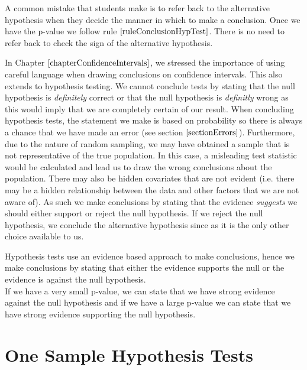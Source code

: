 \begin{nt}
A common mistake that students make is to refer back to the alternative
hypothesis when they decide the manner in which to make a conclusion.
Once we have the p-value we follow rule $\ref{ruleConclusionHypTest}$.
There is no need to refer back to check the sign of the alternative hypothesis.
\end{nt}
In Chapter $\ref{chapterConfidenceIntervals}$, we stressed the importance of using careful language when drawing conclusions on confidence intervals. This also extends to hypothesis testing. We cannot conclude tests by stating that the null hypothesis is \textit{definitely} correct or that the null hypothesis is \textit{definitly} wrong as this would imply that we are completely certain of our result. When concluding hypothesis tests, the statement we make is based on probability so there is always a chance that we have made an error (see section $\ref{sectionErrors}$). Furthermore, due to the nature of random sampling, we may have obtained a sample that is not representative of the true population. In this case, a misleading test statistic would be calculated and lead us to draw the wrong conclusions about the population. There may also be hidden covariates that are not evident (i.e. there may be a hidden relationship between the data and other factors that we are not aware of). As such we make conclusions by stating that the evidence 
\textit{suggests} we should either support or reject the null hypothesis. If we reject the null hypothesis, we conclude the alternative hypothesis since as it is the only other choice available to us.

\begin{nt}
Hypothesis tests use an evidence based approach to make conclusions,
hence we make conclusions by stating that either the
evidence supports the null or the evidence is against the null hypothesis.\\

If we have a very small p-value, we can state that we have strong evidence
against the null hypothesis and if we have a large p-value we can state
that we have strong evidence supporting the null hypothesis.
\end{nt}



\section{One Sample Hypothesis Tests}

